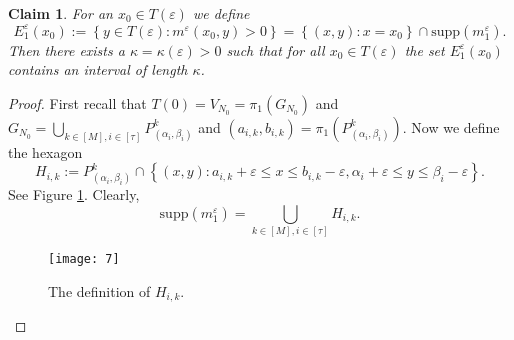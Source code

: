\documentclass[amssymb,amsfonts,12pt,verbatim,righttag,oneside]{amsart}
\numberwithin{equation}{section} %
\theoremstyle{plain}
\theoremstyle{plain}
\newtheorem{claim}[theorem]{Claim}
\begin{document}
\begin{claim}\label{z37}%
  For an $x_0\in T(\varepsilon )$ we define
  \begin{equation}
  \label{z36}
  E _{1}^{\varepsilon }(x_0):=\left\{
    y\in T(\varepsilon ):
    m^{\varepsilon }(x_0,y)>0
   \right\}=
   \left\{ (x,y):x=x_0 \right\}\cap \mathrm{supp}\left( m _{1}^{\varepsilon } \right).
  \end{equation}
  Then there exists a $\kappa=\kappa (\varepsilon )>0$ such that for all $x_0\in T(\varepsilon )$
  the set $E _{1}^{\varepsilon }(x_0)$ contains an interval of length $\kappa$.
\end{claim}

\begin{proof}
  First recall that $T(0)=V_{N_0}=\pi _1\left( G_{N_0} \right)$
  and $G_{N_0}=\bigcup\limits_{k\in[M],i\in[\tau]}P _{(\alpha_i,\beta _i)}^{ k}$  and  $(a_{i,k},b_{i,k})=\pi _1\left( P _{ (\alpha _i,\beta _i)}^{ k} \right)$. Now we define the hexagon
  \begin{equation}
  \label{z35}
  H_{i,k}:=P _{(\alpha_i,\beta _i)}^{ k}
  \cap
  \left\{ (x,y):
  a_{i,k}+\varepsilon \leq x\leq  b_{i,k}-\varepsilon,
  \alpha _i+\varepsilon \leq y \leq
  \beta _i-\varepsilon
  \right\}.
  \end{equation}
  See Figure \ref{y97}.
  Clearly,
  \begin{equation}
  \label{z31}
  \mathrm{supp}(m _{1}^{\varepsilon  })=
  \bigcup\limits_{k\in[M],i\in[\tau]}
  H_{i,k}.
  \end{equation}


\begin{figure}[ht!]
  \texttt{[image: 7]}
  \caption{The definition of $H_{i,k}$.}
  \label{y97}
  \end{figure}


\end{proof}
\end{document}
